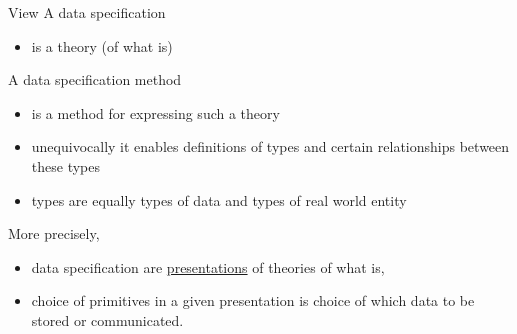 \begin{frame}{View}
A data specification  
\begin{itemize}
\item is a  theory (of what is)
\end{itemize}
\medskip
A data specification method 
\begin{itemize}
\item is a method for expressing such a  theory
\item unequivocally it enables definitions of types and certain relationships between these types
\item types are equally types of data and types of real world entity
\end{itemize}
More precisely, 
\begin{itemize}
\item data specification are \underline{presentations} of theories of what is,
\item choice of primitives in a given presentation is choice of which data to be stored or communicated.
\end{itemize}



\end{frame}


